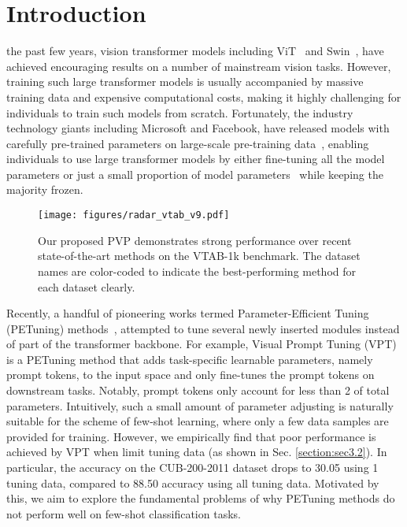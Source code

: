 \documentclass[10pt,journal,letterpaper,compsoc]{IEEEtran}
\begin{document}
\maketitle
\IEEEdisplaynotcompsoctitleabstractindextext
\IEEEpeerreviewmaketitle



\section{Introduction} \label{intro}

 the past few years, vision transformer models including ViT~\cite{vit} and Swin~\cite{swin}, have achieved encouraging results on a number of mainstream vision tasks. However, training such large transformer models is usually accompanied by massive training data and expensive computational costs, making it highly challenging for individuals to train such models from scratch. Fortunately, the industry technology giants including Microsoft and Facebook, have released models with carefully pre-trained parameters on large-scale pre-training data~\cite{russakovsky2015imagenet}, enabling individuals to use large transformer models by either fine-tuning all the model parameters or just a small proportion of model parameters~\cite{2014How,2016Unsupervised,sidetune,BitFit,adapterfusion,adapterhub} while keeping the majority frozen.


\begin{figure}
    \centering
    \texttt{[image: figures/radar\_vtab\_v9.pdf]}

    \caption{Our proposed PVP demonstrates  strong performance over recent state-of-the-art methods on the VTAB-1k benchmark. The dataset names are color-coded to indicate the best-performing method for each dataset clearly.
    }
    \label{fig:radar_vtab}
\end{figure}

Recently, a handful of pioneering works termed Parameter-Efficient Tuning (PETuning) methods~\cite{vpt,adapter,NOAH,convbypass,SSF,FacT}, attempted to tune several newly inserted modules instead of part of the transformer backbone. For example, Visual Prompt Tuning (VPT)~\cite{vpt} is a PETuning method that adds task-specific learnable parameters, namely prompt tokens, to the input space and only fine-tunes the prompt tokens on downstream tasks. Notably, prompt tokens only account for less than 2 of total parameters. Intuitively, such a small amount of parameter adjusting is naturally suitable for the scheme of few-shot learning, where only a few data samples are provided for training. However, we empirically find that poor performance is achieved by VPT when limit tuning data (as shown in Sec. \ref{section:sec3.2}). In particular, the accuracy on the CUB-200-2011 dataset drops to 30.05 using 1 tuning data, compared to 88.50 accuracy using all tuning data. Motivated by this, we aim to explore the fundamental problems of why PETuning methods do not perform well on few-shot classification tasks.
\end{document}
